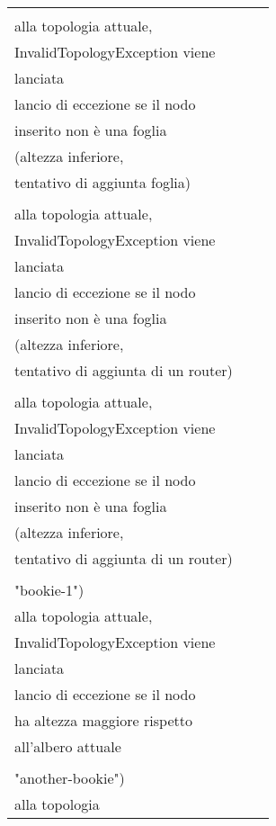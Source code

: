 \documentclass[10pt, a4paper]{article}
\newcommand{\Intmaketable}[4]{
	\begin{longtable}{#3}
	#4
	\caption{#2}
	\label{#1}
	\end{longtable}
}
\newcommand{\Inttestctable}[3]{
	\Intmaketable{#1}{#2}{|l|l|l|}{
	\hline
	\thead{Input} & \thead{Esito atteso} & \thead{Motivazione}\\
	\hline
	\hline
	#3
	\hline}
}
\newcommand{\Inttestccaption}[4]{Casi di test per metodo #1 di #2, iter. #3 (#4)}
\newcommand{\gettablelabel}[5]{table:#1:#2:#3:iter#4:proj#5}
\newcommand{\testctable}[5]{
	\Inttestctable{\gettablelabel{testc}{#1}{#2}{#3}{#4}}
		{\Inttestccaption{#1}{#2}{#3}{#4}}
		{#5}
}
\newcommand{\tcell}{\makecell[tl]}
\newcommand{\newtrow}{\\ \hline}
\def\bookkeeper{BookKeeper}
\begin{document}
	\testctable{add}{NetworkTopologyImpl}{2}{\bookkeeper}{
			\tcell{buildNode("/rack-1","bookie-1")} &
			\tcell{Nessuna variazione rispetto \\ alla topologia 
			attuale, \\InvalidTopologyException viene\\ lanciata} &
			\tcell{La documentazione specifica\\lancio di eccezione
			se il nodo\\ inserito non è una foglia\\ (altezza inferiore,\\
			tentativo di aggiunta foglia)}
		\newtrow
			\tcell{NodeBase("/dc-2")} &
			\tcell{Nessuna variazione rispetto \\ alla topologia 
			attuale, \\InvalidTopologyException viene\\ lanciata} &
			\tcell{La documentazione specifica\\lancio di eccezione
			se il nodo\\ inserito non è una foglia\\ (altezza inferiore,\\
			tentativo di aggiunta di un router)}
		\newtrow
			\tcell{NodeBase("/dc-3/rack-2")} &
			\tcell{Nessuna variazione rispetto \\ alla topologia 
			attuale, \\InvalidTopologyException viene\\ lanciata} &
			\tcell{La documentazione specifica\\lancio di eccezione
			se il nodo\\ inserito non è una foglia\\ (altezza inferiore,\\
			tentativo di aggiunta di un router)}
		\newtrow
			\tcell{buildNode("/region-1/dc-1/rack-1",\\"bookie-1")} &
			\tcell{Nessuna variazione rispetto \\ alla topologia 
			attuale, \\InvalidTopologyException viene\\ lanciata} &
			\tcell{La documentazione specifica\\lancio di eccezione
			se il nodo\\ ha altezza maggiore rispetto\\
			all'albero attuale}
		\newtrow
			\tcell{buildNode("/dc-1/rack-1/bookie-1",\\"another-bookie")} &
			\tcell{Nessuna variazione rispetto \\ alla topologia 
}}
\end{document}
